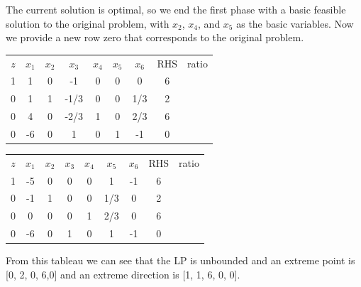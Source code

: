The current solution is optimal, so we end the first phase with a basic feasible solution to the original problem, with $x_2$, $x_4$, and $x_5$ as the basic variables.  Now we provide a new row zero that corresponds to the original problem.

\begin{center} \begin{tabular} {|c|c|c|c|c|c|c||c| r} \cline{1-8}
$z$	& $x_1$	& $x_2$	& $x_3$	& $x_4$	& $x_5$	& $x_6$	&  RHS & ratio \\ \cline{1-8}
1	&	  1 &	  0 &	 -1 &	  0 &	  0 &	  0 &   6 & \\
0	&	  1 &	  1 &	-1/3 &	  0 &	  0 &	  1/3 &	 2 &   \\
0	&	  4 &	  0 &	-2/3 &	  1 &	  0 &	  2/3 &	 6 &  \\
0	&	 -6 &	  0 &	 1 &	  0 &	  1 &	  -1 &	 0 &  \\ \cline{1-8}
\end{tabular} \end{center}

\begin{center} \begin{tabular} {|c|c|c|c|c|c|c||c| r} \cline{1-8}
$z$	& $x_1$	& $x_2$	& $x_3$	& $x_4$	& $x_5$	& $x_6$	&  RHS & ratio \\ \cline{1-8}
1	&	 -5 &	  0 &	  0 &	  0 &	  1 &	  -1 &   6 & \\
0	&	 -1 &	  1 &	  0 &	  0 &	1/3 &	  0 &	 2 &   \\
0	&	  0 &	  0 &	  0 &	  1 &	2/3 &	  0 &	 6 &  \\
0	&	 -6 &	  0 &	  1 &	  0 &	  1 &	  -1 &	 0 &  \\ \cline{1-8}
\end{tabular} \end{center}
From this tableau we can see that the LP is unbounded and an extreme point is [0, 2, 0, 6,0] and an extreme direction is [1, 1, 6, 0, 0].




